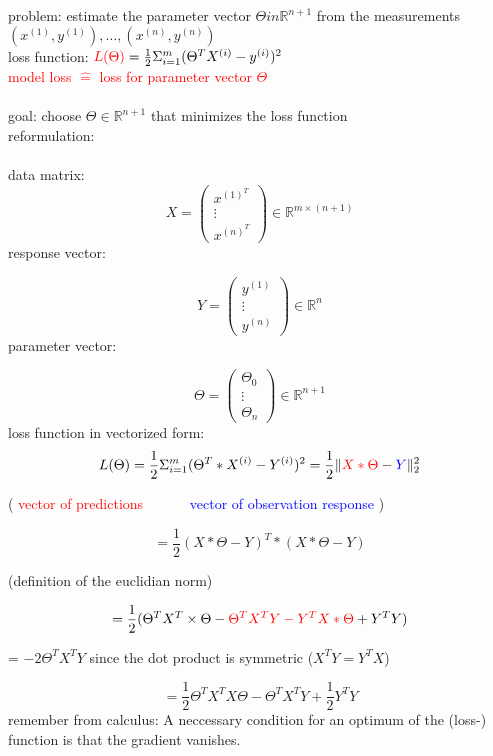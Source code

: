 \documentclass[a4paper, 12pt]{scrartcl}
\begin{document}
problem: estimate the parameter vector $\Theta in \mathbb{R}^{n+1}$ from the measurements $(x^{(1)}, y^{(1)}), \dots , (x^{(n)}, y^{(n)})$\\
loss function: $\textcolor{red}{L(\Theta)} = \frac{1}{2} \Sigma^m_{i=1} (\Theta^T X^{(i)} - y^{(i)})^2$\\
\textcolor{red}{model loss $\hat{=}$ loss for parameter vector $\Theta$}\\\\
goal: choose $\Theta \in \mathbb{R}^{n+1}$ that minimizes the loss function\\
reformulation:\\\\
data matrix:
\[ X =\left( \begin{array}{ccc}
x^{(1)^T} \\
\vdots \\
x^{(n)^T} \end{array} \right) \in \mathbb{R}^{m \times (n+1)}\]
response vector:

\[ Y =\left( \begin{array}{ccc}
y^{(1)} \\
\vdots \\
y^{(n)} \end{array} \right) \in \mathbb{R}^n\]
parameter vector:

\[ \Theta =\left( \begin{array}{ccc}
\Theta_0 \\
\vdots \\
\Theta_n \end{array} \right) \in \mathbb{R}^{n+1}\]
loss function in vectorized form:
\[L(\Theta) = \frac{1}{2} \Sigma^m_{i=1} (\Theta^T * X^{(i)} - Y^{(i)})^2 = \frac{1}{2} \lVert \textcolor{red}{X * \Theta} - \textcolor{blue}{Y} \lVert^2_2\]

\begin{center}
( \textcolor{red}{vector of predictions}$\quad\quad\quad$ \textcolor{blue}{vector of observation response} )
\end{center}
\[ = \frac{1}{2} (X * \Theta -Y)^T * (X * \Theta - Y)\]
\begin{center}
(definition of the euclidian norm)
\end{center}
\[ = \frac{1}{2} (\Theta^T X^T \times \Theta - \textcolor{red}{\Theta^T X^T Y - Y^T X*\Theta} + Y^T Y)\]
\begin{center}
= $-2 \Theta^T X^T Y$ since the dot product is symmetric ($X^T Y = Y^T X$)
\end{center}
\[= \frac{1}{2} \Theta^T X^T X \Theta - \Theta^T X^T Y + \frac{1}{2} Y^T Y\]
remember from calculus: A neccessary condition for an optimum of the (loss-) function is that the gradient vanishes.\\
\end{document}
